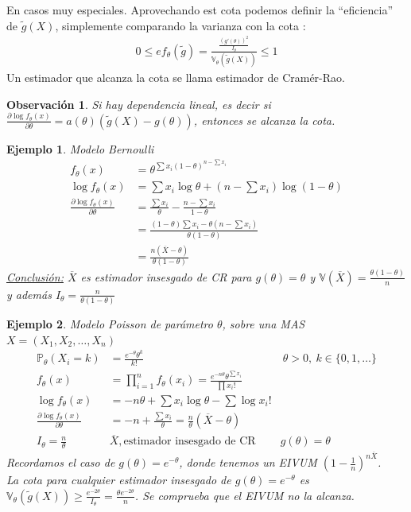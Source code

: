 \documentclass[10pt]{article}
\theoremstyle{plain}
\newtheorem{obs}{Observación}
\newtheorem{ej}{Ejemplo}
\theoremstyle{definition}
\begin{document}
En casos muy especiales. Aprovechando est cota podemos definir la ``eficiencia'' de $\tilde{g}(X)$, simplemente comparando la varianza con la cota :
\begin{align*}
0 \le ef_{\theta}(\tilde{g}) = \frac{\frac{(g'(\theta))^2}{I_{\theta}}}{\mathbb{V}_{\theta}(\tilde{g}(X))} \le 1
\end{align*}
Un estimador que alcanza la cota se llama estimador de Cramér-Rao.

\begin{obs}
Si hay dependencia lineal, es decir si $\frac{\partial \log f_{\theta}(x)}{\partial \theta} = a(\theta)(\tilde{g}(X)-g(\theta))$, entonces se alcanza la cota.
\end{obs}

\begin{ej} Modelo Bernoulli\\
\begin{align*}
f_{\theta}(x) &= \theta^{\sum{x_{i}}(1-\theta)^{n-\sum{x_{i}}}}\\
\log f_{\theta}(x) &= \sum x_{i} \log{\theta} + (n-\sum{x_{i}})\log{(1-\theta)}\\
\frac{\partial \log f_{\theta}(x)}{\partial \theta} &= \frac{\sum x_{i}}{\theta} - \frac{n-\sum{x_{i}}}{1-\theta}\\
&= \frac{(1-\theta)\sum{x_{i}}-\theta (n-\sum{x_{i}})}{\theta (1-\theta)}\\
&= \frac{n(\overline{X}-\theta)}{\theta (1-\theta)}
\end{align*}
\underline{Conclusión:} $\overline{X}$ es estimador insesgado de CR para $g(\theta)= \theta$ y $\mathbb{V}(\overline{X}) = \frac{\theta (1-\theta)}{n}$ y además $I_{\theta} = \frac{n}{\theta (1-\theta)}$
\end{ej}

\begin{ej} Modelo Poisson de parámetro $\theta$, sobre una MAS $X=(X_{1},X_{2},\ldots,X_{n})$\\
\begin{align*}
\mathbb{P}_{\theta}(X_{i}=k) &= \frac{e^{-\theta}\theta^{k}}{k!} &\ \theta >0,\ k\in \{0,1,\ldots\}\\
f_{\theta}(x) &= \prod_{i=1}^n f_{\theta}(x_{i}) = \frac{e^{-n\theta}\theta^{\sum x_{i}}}{\prod x_{i}!}&\\
\log f_{\theta}(x) &= -n\theta + \sum x_{i} \log \theta - \sum{\log x_{i}!}&\\
\frac{\partial \log f_{\theta}(x)}{\partial \theta} &= -n + \frac{\sum x_{i}}{\theta} = \frac{n}{\theta}(\overline{X}-\theta)\\
I_{\theta} = \frac{n}{\theta} & \overline{X}, \text{estimador insesgado de CR} & g(\theta) = \theta
\end{align*}
Recordamos el caso de $g(\theta) = e^{-\theta}$, donde tenemos un EIVUM $\left(1-\frac{1}{n}\right)^{n\overline{X}}$.\\
La cota para cualquier estimador insesgado de $g(\theta) = e^{-\theta}$ es $\mathbb{V}_{\theta}(\tilde{g}(X)) \ge \frac{e^{-2\theta}}{I_{\theta}} = \frac{\theta e^{-2\theta}}{n}$. Se comprueba que el EIVUM no la alcanza.
\end{ej}
\end{document}

